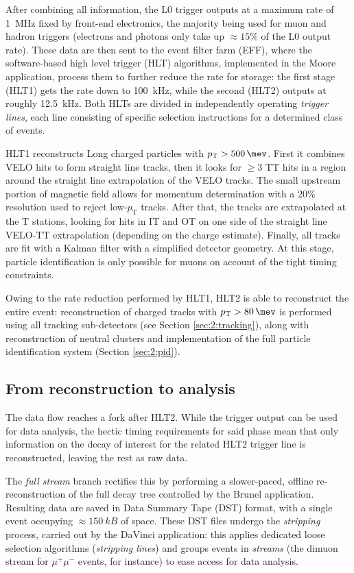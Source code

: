 After combining all information, the L0 trigger outputs at a maximum rate of \SI{1}{\mega\hertz} fixed by front-end electronics, the majority being used for muon and hadron triggers (electrons and photons only take up $\approx 15\%$ of the L0 output rate).
These data are then sent to the event filter farm (EFF), where the software-based high level trigger (HLT) algorithms, implemented in the Moore application, process them to further reduce the rate for storage:
the first stage (HLT1) gets the rate down to \SI{100}{\kilo\hertz}, while the second (HLT2) outputs at roughly \SI{12.5}{\kilo\hertz}.
Both HLTs are divided in independently operating \textit{trigger lines}, each line consisting of specific selection instructions for a determined class of events.

HLT1 reconstructs Long charged particles with $p_\text{T} > \SI{500}{\mev}$. First it combines VELO hits to form straight line tracks, then it looks for $\geq 3$ TT hits in a region around the straight line extrapolation of the VELO tracks. The small upstream portion of magnetic field allows for momentum determination with a $20\%$ resolution used to reject low-$p_\text{T}$ tracks.
After that, the tracks are extrapolated at the T stations, looking for hits in IT and OT on one side of the straight line VELO-TT extrapolation (depending on the charge estimate).
Finally, all tracks are fit with a Kalman filter with a simplified detector geometry.
At this stage, particle identification is only possible for muons on account of the tight timing constraints.

Owing to the rate reduction performed by HLT1, HLT2 is able to reconstruct the entire event:
reconstruction of charged tracks with $p_\text{T} > \SI{80}{\mev}$ is performed using all tracking sub-detectors (see Section \ref{sec:2:tracking}), along with reconstruction of neutral clusters and implementation of the full particle identification system (Section \ref{sec:2:pid}).

\subsection{From reconstruction to analysis}
The data flow reaches a fork after HLT2.
While the trigger output can be used for data analysis, the hectic timing requirements for said phase mean that only information on the decay of interest for the related HLT2 trigger line is reconstructed, leaving the rest as raw data.

The \textit{full stream} branch rectifies this by performing a slower-paced, offline re-reconstruction of the full decay tree controlled by the Brunel application.
Resulting data are saved in Data Summary Tape (DST) format, with a single event occupying $\approx \SI{150}{kB}$ of space.
These DST files undergo the \textit{stripping} process, carried out by the DaVinci application: this applies dedicated loose selection algorithms (\textit{stripping lines}) and groups events in \textit{streams} (the dimuon stream for $\mu^+\mu^-$ events, for instance) to ease access for data analysis.

